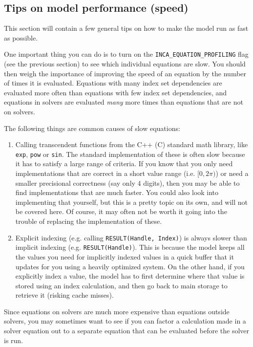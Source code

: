 \documentclass[11pt]{article}
\theoremstyle{definition}
\begin{document}
\subsection{Tips on model performance (speed)}\label{sec:performance}

This section will contain a few general tips on how to make the model run as fast as possible.

One important thing you can do is to turn on the {\tt INCA\_EQUATION\_PROFILING} flag (see the previous section) to see which individual equations are slow. You should then weigh the importance of improving the speed of an equation by the number of times it is evaluated. Equations with many index set dependencies are evaluated more often than equations with few index set dependencies, and equations in solvers are evaluated \emph{many} more times than equations that are not on solvers.

The following things are common causes of slow equations:
\begin{enumerate}[i]
\item Calling transcendent functions from the C++ (C) standard math library, like {\tt exp}, {\tt pow} or {\tt sin}. The standard implementation of these is often slow because it has to satisfy a large range of criteria. If you know that you only need implementations that are correct in a short value range (i.e. $[0, 2\pi)$) or need a smaller precisional correctness (say only 4 digits), then you may be able to find implementations that are much faster. You could also look into implementing that yourself, but this is a pretty topic on its own, and will not be covered here. Of course, it may often not be worth it going into the trouble of replacing the implementation of these.
\item Explicit indexing (e.g. calling {\tt RESULT(Handle, Index)}) is always slower than implicit indexing (e.g. {\tt RESULT(Handle)}). This is because the model keeps all the values you need for implicitly indexed values in a quick buffer that it updates for you using a heavily optimized system. On the other hand, if you explicitly index a value, the model has to first determine where that value is stored using an index calculation, and then go back to main storage to retrieve it (risking cache misses).
\end{enumerate}

Since equations on solvers are much more expensive than equations outside solvers, you may sometimes want to see if you can factor a calculation made in a solver equation out to a separate equation that can be evaluated before the solver is run.
\end{document}

